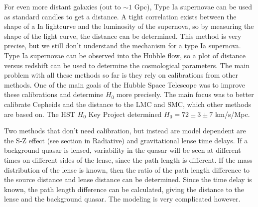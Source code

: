For even more distant galaxies (out to $\sim1$ Gpc), Type Ia supernovae 
can be used as standard candles to get a distance.  A tight correlation 
exists between the shape of a Ia lightcurve and the luminosity of the 
supernova, so by measuring the shape of the light curve, the distance can 
be determined.  This method is very precise, but we still don't understand 
the mechanism for a type Ia supernova.  Type Ia supernovae can be observed 
into the Hubble flow, so a plot of distance versus redshift can be used 
to determine the cosmological parameters.  The main problem with all these 
methods so far is they rely on calibrations from other methods.  One of the 
main goals of the Hubble Space Telescope was to improve these calibrations 
and determine $H_0$ more precisely.  The main focus was to better calibrate 
Cepheids and the distance to the LMC and SMC, which other methods are based 
on.  The HST $H_0$ Key Project determined $H_0=72\pm3\pm7$ km/s/Mpc.

Two methods that don't need calibration, but instead are model dependent 
are the S-Z effect (see section in Radiative) and gravitational lense 
time delays.  If a background quasar is lensed, variability in the quasar 
will be seen at different times on different sides of the lense, since the 
path length is different.  If the mass distribution of the lense is known, 
then the ratio of the path length difference to the source distance and lense 
distance can be determined.  Since the time delay is known, the path length 
difference can be calculated, giving the distance to the lense and the 
background quasar.  The modeling is very complicated however.  

